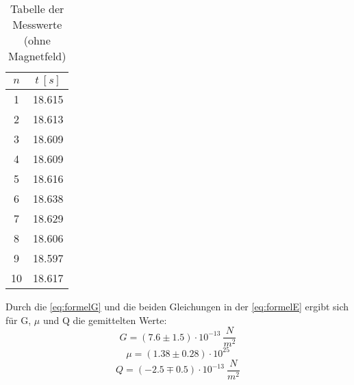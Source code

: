 \begin{table}[htp]
  \centering
  \caption{Tabelle der Messwerte (ohne Magnetfeld)}
  \label{tab:tabb}
  \begin{tabular}{c c}
      \toprule
      $ n $ & $t \ [s]$\\
      \midrule
      1 & 18.615\\
      2 & 18.613\\
      3 & 18.609\\
      4 & 18.609\\
      5 & 18.616\\
      6 & 18.638\\
      7 & 18.629\\
      8 & 18.606\\
      9 & 18.597\\
      10 & 18.617\\
      \bottomrule
  \end{tabular}
\end{table}
\newpage
Durch die \autoref{eq:formelG} und die beiden Gleichungen in der \autoref{eq:formelE} ergibt sich für G, $\mu$ und Q die gemittelten Werte:
\begin{equation}
  G = (7.6 \pm 1.5)\cdot 10^{-13}\ \frac{N}{m^2}
\end{equation}
\begin{equation}
  \mu = (1.38 \pm 0.28)\cdot 10^{25}
\end{equation}
\begin{equation}
  Q = (-2.5 \mp 0.5)\cdot 10^{-13}\ \frac{N}{m^2}
\end{equation}

